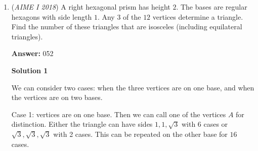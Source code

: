 \begin{enumerate}
 



\textbf{Solution 6 (Official MAA)}

If $z$ satisfies the given conditions, there is a $\theta \in [0,2\pi]$ such that $z=e^{i\theta}$ and $e^{720\theta i-120\theta i}$ is real. This difference is real if and only if either the two numbers $720\theta$ and $120\theta$ represent the same angle or the two numbers represent supplementary angles. In the first case there is an integer $k$ such that $720\theta=120\theta+2k\pi,$ which implies that $\theta$ is a multiple of $\frac{\pi}{300}.$ In the second case there is an integer $k$ such that $720\theta=-120\theta+(2k+1)\pi,$ which implies that $\theta$ is $\frac{\pi}{840}$ plus a multiple of $\frac{\pi}{420}.$ In the interval $[0,2\pi]$ there are $600$ values of $\theta$ that are multiples of $\frac{\pi}{300},$ there are $840$ values that are $\frac{\pi}{840}$ plus a multiple of $\frac{\pi}{420},$ and there are no values of $\theta$ that satisfy both of these conditions. Therefore theremust be $600+840=1440$ complex numbers satisfying the given conditions. The requested remainder is $440.$




\textbf{Solution 7}

$z^{720}-z^{120}=z^{120}(z^{600}-1)$ firstly we consider that $z^{600}-1=0$ obviously there are $600$ different roots

 Then, we consider that $z^{720}=a+bi, z^{120}=-a+bi$ or $z^{720}=-a-bi, z^{120}=a-bi$ which leads to $840\theta=\pi+2k\pi, k\in N$ so there are $840$ roots, in all, $840+600 \equiv 440 ($ mod $1000)$.

 


	\item (\textit{AIME I 2018}) A right hexagonal prism has height $2$. The bases are regular hexagons with side length $1$. Any $3$ of the $12$ vertices determine a triangle. Find the number of these triangles that are isosceles (including equilateral triangles).


 
 \textbf{Answer: }052



\textbf{Solution 1}

We can consider two cases: when the three vertices are on one base, and when the vertices are on two bases.

 Case 1: vertices are on one base. Then we can call one of the vertices $A$ for distinction. Either the triangle can have sides $1, 1, \sqrt{3}$ with 6 cases or $\sqrt{3}, \sqrt{3}, \sqrt{3}$ with 2 cases. This can be repeated on the other base for $16$ cases.


\end{enumerate}
